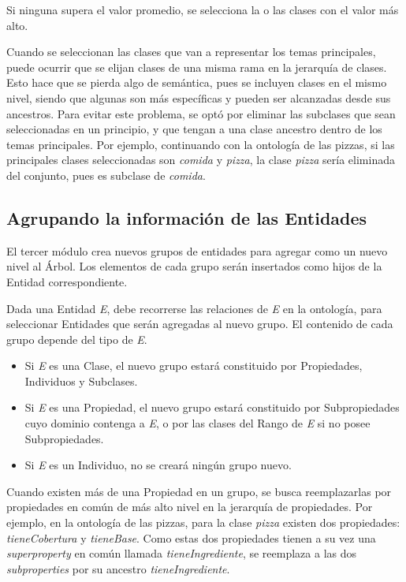 Si ninguna supera el valor promedio, se selecciona la o las clases con el valor más alto.

Cuando se seleccionan las clases que van a representar los temas principales, puede ocurrir que se elijan clases de una misma rama en la jerarquía de clases. Esto hace que se pierda algo de semántica, pues se incluyen clases en el mismo nivel, siendo que algunas son más específicas y pueden ser alcanzadas desde sus ancestros. Para evitar este problema, se optó por eliminar las subclases que sean seleccionadas en un principio, y que tengan a una clase ancestro dentro de los temas principales. Por ejemplo, continuando con la ontología de las pizzas, si las principales clases seleccionadas son \emph{comida} y \emph{pizza}, la clase \emph{pizza} sería eliminada del conjunto, pues es subclase de \emph{comida}. 

\subsection{Agrupando la información de las Entidades}
\label{sec:agrupando_info}
El tercer módulo crea nuevos grupos de entidades para agregar como un nuevo nivel al Árbol. Los elementos de cada grupo serán insertados como hijos de la Entidad correspondiente.

Dada una Entidad \emph{E}, debe recorrerse las relaciones de \emph{E} en la ontología, para seleccionar Entidades que serán agregadas al nuevo grupo.
El contenido de cada grupo depende del tipo de \emph{E}.
\begin{itemize}
    \item Si \emph{E} es una Clase, el nuevo grupo estará constituido por Propiedades, Individuos y Subclases. 
    \item Si \emph{E} es una Propiedad, el nuevo grupo estará constituido por Subpropiedades cuyo dominio contenga a \emph{E}, o por las clases del Rango de \emph{E} si no posee Subpropiedades.
    \item Si \emph{E} es un Individuo, no se creará ningún grupo nuevo.
\end{itemize}

Cuando existen más de una Propiedad en un grupo, se busca reemplazarlas por propiedades en común de más alto nivel en la jerarquía de propiedades. Por ejemplo, en la ontología de las pizzas, para la clase \emph{pizza} existen dos propiedades: \emph{tieneCobertura} y \emph{tieneBase}. Como estas dos propiedades tienen a su vez una \emph{superproperty} en común llamada \emph{tieneIngrediente}, se reemplaza a las dos \emph{subproperties} por su ancestro \emph{tieneIngrediente}.

